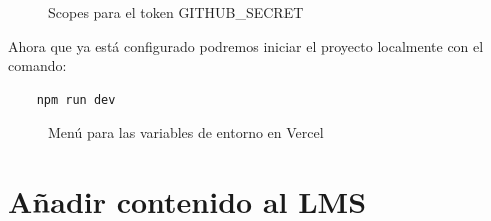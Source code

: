 \begin{figure}[H]
    \centering
    \caption{Scopes para el token GITHUB\_SECRET}
    \label{fig:scopes}
\end{figure}

Ahora que ya está configurado podremos iniciar el proyecto localmente con el comando:
\begin{verbatim}
    npm run dev
\end{verbatim}

\begin{figure}[H]
    \centering
    \caption{Menú para las variables de entorno en Vercel}
    \label{fig:vercelEnv}
\end{figure}

\section{Añadir contenido al LMS}


